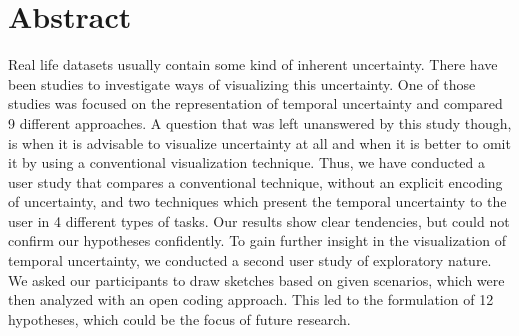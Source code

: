 \chapter*{Abstract}

Real life datasets usually contain some kind of inherent uncertainty. There have been studies to investigate ways of visualizing this uncertainty. One of those studies was focused on the representation of temporal uncertainty and compared 9 different approaches. A question that was left unanswered by this study though, is when it is advisable to visualize uncertainty at all and when it is better to omit it by using a conventional visualization technique. Thus, we have conducted a user study that compares a conventional technique, without an explicit encoding of uncertainty, and two techniques which present the temporal uncertainty to the user in 4 different types of tasks. Our results show clear tendencies, but could not confirm our hypotheses confidently. To gain further insight in the visualization of temporal uncertainty, we conducted a second user study of exploratory nature. We asked our participants to draw sketches based on given scenarios, which were then analyzed with an open coding approach. This led to the formulation of 12 hypotheses, which could be the focus of future research.